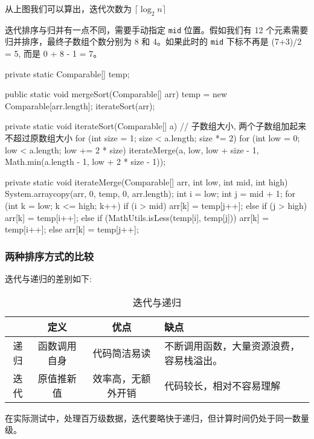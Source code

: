 从上图我们可以算出，迭代次数为 $\lceil \log_2 n \rceil$

迭代排序与归并有一点不同，需要手动指定 \texttt{mid} 位置。假如我们有 12 个元素需要归并排序，最终子数组个数分别为 8 和 4。如果此时的 \texttt{mid} 下标不再是 (7+3)/2 = 5, 而是 0 + 8 - 1 = 7。

\begin{Java}
private static Comparable[] temp;

public static void mergeSort(Comparable[] arr) {
    temp = new Comparable[arr.length];
    iterateSort(arr);
}

private static void iterateSort(Comparable[] a) {
    // 子数组大小, 两个子数组加起来不超过原数组大小
    for (int size = 1; size < a.length; size *= 2) {
        for (int low = 0; low < a.length; low += 2 * size) {
            iterateMerge(a, low, low + size - 1, Math.min(a.length - 1, low + 2 * size - 1));
        }
    }
}

private static void iterateMerge(Comparable[] arr, int low, int mid, int high) {
    System.arraycopy(arr, 0, temp, 0, arr.length);
    int i = low;
    int j = mid + 1;
    for (int k = low; k <= high; k++) {
        if (i > mid) arr[k] = temp[j++];
        else if (j > high) arr[k] = temp[i++];
        else if (MathUtils.isLess(temp[i], temp[j]))
            arr[k] = temp[i++];
        else
            arr[k] = temp[j++];
    }
}
\end{Java}

\subsubsection*{两种排序方式的比较}

迭代与递归的差别如下:
\begin{table}[H]
    \centering
    \caption{迭代与递归}
    \label{table:迭代与递归}
    \setlength{\tabcolsep}{4mm}
    \begin{tabular}{c|ccp{5cm}}
        \toprule
        \textbf{} & \textbf{定义} & \textbf{优点} & \textbf{缺点} \\
        \midrule
        递归 & 函数调用自身 & 代码简洁易读 & 不断调用函数，大量资源浪费，容易栈溢出。 \\
        \midrule
        迭代 & 原值推新值 & 效率高，无额外开销 & 代码较长，相对不容易理解 \\
        \bottomrule
    \end{tabular}
\end{table}

在实际测试中，处理百万级数据，迭代要略快于递归，但计算时间仍处于同一数量级。

